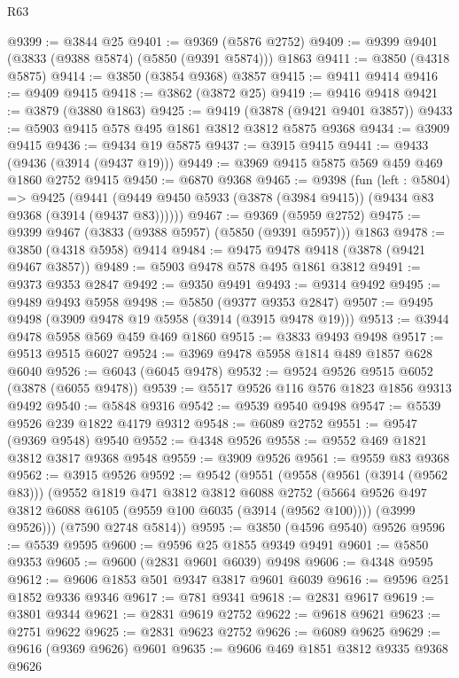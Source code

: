 \begin{lexlean}{R63}
\begin{coremodule}
@9399 := @3844 @25
@9401 := @9369 (@5876 @2752)
@9409 := @9399 @9401 (@3833 (@9388 @5874) (@5850 (@9391 @5874))) @1863
@9411 := @3850 (@4318 @5875)
@9414 := @3850 (@3854 @9368) @3857
@9415 := @9411 @9414
@9416 := @9409 @9415
@9418 := @3862 (@3872 @25)
@9419 := @9416 @9418
@9421 := @3879 (@3880 @1863)
@9425 := @9419 (@3878 (@9421 @9401 @3857))
@9433 := @5903 @9415 @578 @495 @1861 @3812 @3812 @5875 @9368
@9434 := @3909 @9415
@9436 := @9434 @19 @5875
@9437 := @3915 @9415
@9441 := @9433 (@9436 (@3914 (@9437 @19)))
@9449 := @3969 @9415 @5875 @569 @459 @469 @1860 @2752 @9415
@9450 := @6870 @9368
@9465 := @9398
    (fun (left : @5804) =>
    @9425 (@9441 (@9449 @9450 @5933 (@3878 (@3984 @9415)) (@9434 @83 @9368 (@3914 (@9437 @83))))))
@9467 := @9369 (@5959 @2752)
@9475 := @9399 @9467 (@3833 (@9388 @5957) (@5850 (@9391 @5957))) @1863
@9478 := @3850 (@4318 @5958) @9414
@9484 := @9475 @9478 @9418 (@3878 (@9421 @9467 @3857))
@9489 := @5903 @9478 @578 @495 @1861 @3812
@9491 := @9373 @9353 @2847
@9492 := @9350 @9491
@9493 := @9314 @9492
@9495 := @9489 @9493 @5958
@9498 := @5850 (@9377 @9353 @2847)
@9507 := @9495 @9498 (@3909 @9478 @19 @5958 (@3914 (@3915 @9478 @19)))
@9513 := @3944 @9478 @5958 @569 @459 @469 @1860
@9515 := @3833 @9493 @9498
@9517 := @9513 @9515 @6027
@9524 := @3969 @9478 @5958 @1814 @489 @1857 @628 @6040
@9526 := @6043 (@6045 @9478)
@9532 := @9524 @9526 @9515 @6052 (@3878 (@6055 @9478))
@9539 := @5517 @9526 @116 @576 @1823 @1856 @9313 @9492
@9540 := @5848 @9316
@9542 := @9539 @9540 @9498
@9547 := @5539 @9526 @239 @1822 @4179 @9312
@9548 := @6089 @2752
@9551 := @9547 (@9369 @9548) @9540
@9552 := @4348 @9526
@9558 := @9552 @469 @1821 @3812 @3817 @9368 @9548
@9559 := @3909 @9526
@9561 := @9559 @83 @9368
@9562 := @3915 @9526
@9592 := @9542
    (@9551
      (@9558
        (@9561 (@3914 (@9562 @83)))
        (@9552
          @1819
          @471
          @3812
          @3812
          @6088
          @2752
          (@5664 @9526 @497 @3812 @6088 @6105 (@9559 @100 @6035 (@3914 (@9562 @100))))
          (@3999 @9526)))
      (@7590 @2748 @5814))
@9595 := @3850 (@4596 @9540) @9526
@9596 := @5539 @9595
@9600 := @9596 @25 @1855 @9349 @9491
@9601 := @5850 @9353
@9605 := @9600 (@2831 @9601 @6039) @9498
@9606 := @4348 @9595
@9612 := @9606 @1853 @501 @9347 @3817 @9601 @6039
@9616 := @9596 @251 @1852 @9336 @9346
@9617 := @781 @9341
@9618 := @2831 @9617
@9619 := @3801 @9344
@9621 := @2831 @9619 @2752
@9622 := @9618 @9621
@9623 := @2751 @9622
@9625 := @2831 @9623 @2752
@9626 := @6089 @9625
@9629 := @9616 (@9369 @9626) @9601
@9635 := @9606 @469 @1851 @3812 @9335 @9368 @9626

\end{coremodule}
\end{lexlean}
